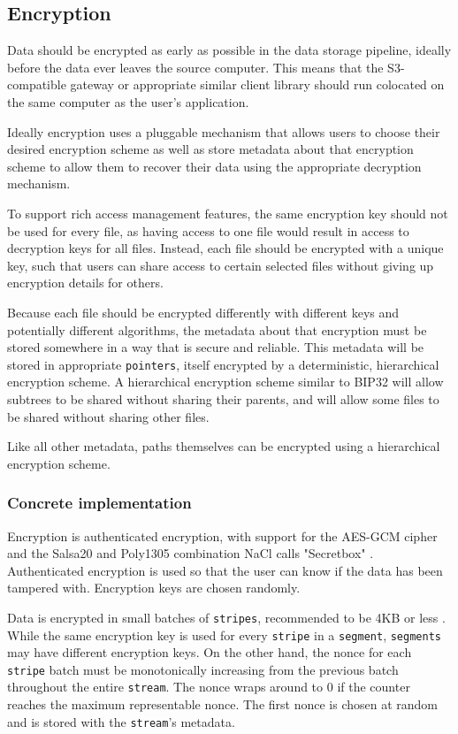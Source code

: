 \documentclass[a4paper,10pt]{article} \usepackage[utf8]{inputenc}
\newcommand{\x}[1]{{\tt #1}} \newcommand{\code}[1]{{\tt #1}}
\begin{document}
\subsection{Encryption}

Data should be encrypted as early as possible in the data storage pipeline,
ideally before the data ever leaves the source computer. This means that the
S3-compatible gateway or appropriate similar client library should run
colocated on the same computer as the user's application.

Ideally encryption uses a pluggable mechanism that allows users to choose their
desired encryption scheme as well as store metadata about that encryption
scheme to allow them to recover their data using the appropriate decryption
mechanism.

To support rich access management features, the same encryption key should not
be used for every file, as having access to one file would result in access
to decryption keys for all files. Instead, each file should be encrypted with
a unique key, such that users can share access to certain selected files
without giving up encryption details for others.

Because each file should be encrypted differently with different keys and
potentially different algorithms, the metadata about that encryption must
be stored somewhere in a way that is secure and reliable. This metadata will
be stored in appropriate \x{pointers}, itself encrypted by a deterministic,
hierarchical encryption scheme. A hierarchical encryption scheme similar to
BIP32 \cite{bip32} will allow subtrees to be shared without sharing their
parents, and will allow some files to be shared without sharing other files.

Like all other metadata, paths themselves can be encrypted using a hierarchical
encryption scheme.

\subsubsection{Concrete implementation}

Encryption is authenticated encryption, with support for the AES-GCM cipher
and the Salsa20 and Poly1305 combination NaCl calls "Secretbox"
\cite{nacl-crypto}. Authenticated encryption is used so that the user can know
if the data has been tampered with. Encryption keys are chosen randomly.

Data is encrypted in small batches of \x{stripes}, recommended to be 4KB or
less \cite{nacl-packetlen}. While the same encryption key is used for every
\x{stripe} in a \x{segment}, \x{segments} may have
different encryption keys. On the other hand, the nonce for each \x{stripe}
batch must be monotonically increasing from the previous batch throughout the
entire \x{stream}. The nonce wraps around to 0 if the counter reaches the
maximum representable nonce. The first nonce is chosen at random and is stored
with the \x{stream}'s metadata.
\end{document}
